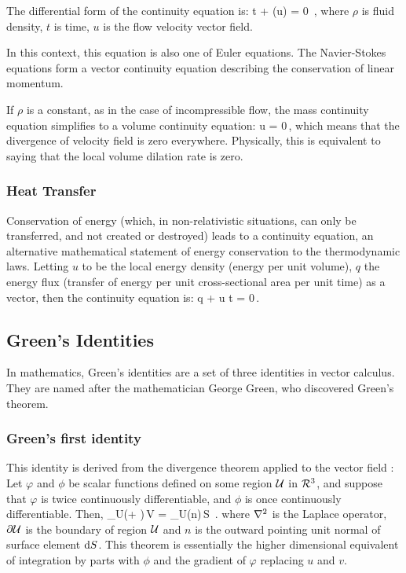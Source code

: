 The differential form of the continuity equation is:
\beq
\xpd\rho t + \gder\iprod(\rho u) = 0 \,,
\eeq
where $\rho$ is fluid density, $t$ is time, $u$ is the flow velocity vector field.

In this context, this equation is also one of Euler equations. The Navier-Stokes equations form a vector continuity equation describing the conservation of linear momentum.

If $\rho$ is a constant, as in the case of incompressible flow, the mass continuity equation simplifies to a volume continuity equation:
\beq
\gder\iprod u = 0\,,
\eeq
which means that the divergence of velocity field is zero everywhere. Physically, this is equivalent to saying that the local volume dilation rate is zero.


\subsubsection{Heat Transfer}
Conservation of energy (which, in non-relativistic situations, can only be transferred, and not created or destroyed) leads to a continuity equation, an alternative mathematical statement of energy conservation to the thermodynamic laws.
Letting $u$ to be the local energy density (energy per unit volume), $q$ the energy flux (transfer of energy per unit cross-sectional area per unit time) as a vector, then the continuity equation is:
\beq
\gder\iprod q + \xpd u t = 0\,.
\eeq


\subsection{Green's Identities}
In mathematics, Green's identities are a set of three identities in vector calculus. They are named after the mathematician George Green, who discovered Green's theorem.


\subsubsection{Green's first identity}
This identity is derived from the divergence theorem applied to the vector field : Let $\varphi$ and $\phi$ be scalar functions defined on some region $\mathcal{U}$ in $\mathcal{R}^{3}$, and suppose that $\varphi$ is twice continuously differentiable, and $\phi$ is once continuously differentiable. Then,
\beq
\int_{\region U}\left(\phi\lder\varphi + \grad\varphi\iprod \grad\phi \right)\,\dx\region V 
    = \oint_{\bound\region U}\phi(\grad\varphi\iprod n)\,\dx S \,.
\eeq
where $\nabla^2$ is the Laplace operator, $\partial\mathcal{U}$ is the boundary of region $\mathcal{U}$ and $n$ is the outward pointing unit normal of surface element $\text{d} S$. This theorem is essentially the higher dimensional equivalent of integration by parts with $\phi$ and the gradient of $\varphi$ replacing $u$ and $v$.

